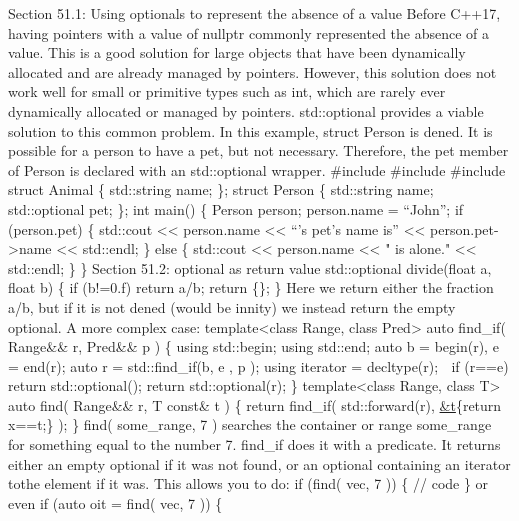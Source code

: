 Section 51.1: Using optionals to represent the absence of a value Before
C++17, having pointers with a value of nullptr commonly represented the
absence of a value. This is a good solution for large objects that have
been dynamically allocated and are already managed by pointers. However,
this solution does not work well for small or primitive types such as
int, which are rarely ever dynamically allocated or managed by pointers.
std::optional provides a viable solution to this common problem. In this
example, struct Person is dened. It is possible for a person to have a
pet, but not necessary. Therefore, the pet member of Person is declared
with an std::optional wrapper. \#include \#include \#include struct
Animal \{ std::string name; \}; struct Person \{ std::string name;
std::optional pet; \}; int main() \{ Person person; person.name =
``John''; if (person.pet) \{ std::cout \textless\textless{} person.name
\textless\textless{} ``'s pet's name is'' \textless\textless{}
person.pet-\textgreater name \textless\textless{} std::endl; \} else \{
std::cout \textless\textless{} person.name \textless\textless{} " is
alone." \textless\textless{} std::endl; \} \} Section 51.2: optional as
return value std::optional divide(float a, float b) \{ if (b!=0.f)
return a/b; return \{\}; \} Here we return either the fraction a/b, but
if it is not dened (would be innity) we instead return the empty
optional. A more complex case: template\textless class Range, class
Pred\textgreater{} auto find\_if( Range\&\& r, Pred\&\& p ) \{ using
std::begin; using std::end; auto b = begin(r), e = end(r); auto r =
std::find\_if(b, e , p ); using iterator = decltype(r);  if (r==e)
return std::optional(); return std::optional(r); \}
template\textless class Range, class T\textgreater{} auto find(
Range\&\& r, T const\& t ) \{ return find\_if( std::forward(r),
\href{auto\&\&\%20x}{\&t}\{return x==t;\} ); \} find( some\_range, 7 )
searches the container or range some\_range for something equal to the
number 7. find\_if does it with a predicate. It returns either an empty
optional if it was not found, or an optional containing an iterator
tothe element if it was. This allows you to do: if (find( vec, 7 )) \{
// code \} or even if (auto oit = find( vec, 7 )) \{
